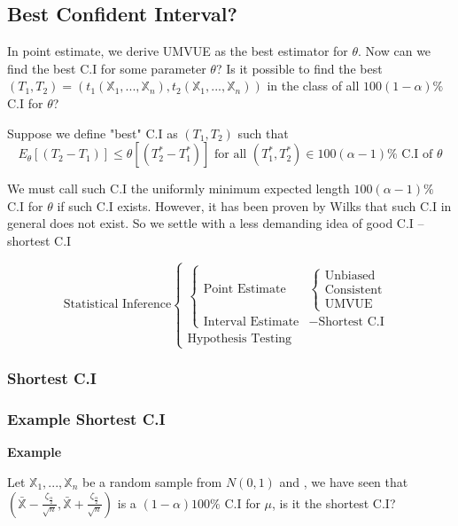 \subsection{Best Confident Interval?}

In point estimate, we derive UMVUE as the best estimator for $\theta$. Now can we find the best C.I for some parameter $\theta$? Is it possible to find the best $(T_1, T_2) = (t_1(\mathbb{X}_1, ..., \mathbb{X}_n), t_2(\mathbb{X}_1, ..., \mathbb{X}_n))$ in the class of all $100(1-\alpha)\%$ C.I for $\theta$?

Suppose we define "best" C.I as $(T_1, T_2)$ such that 
$$E_\theta[(T_2-T_1)] \leq \theta[(T_2^*-T_1^*)] \text{ for all } (T_1^*, T_2^*) \in 100(\alpha-1)\% \text{ C.I of } \theta $$

We must call such C.I the uniformly minimum expected length $100(\alpha-1)\%$ C.I for $\theta$ if such C.I exists. However, it has been proven by Wilks that such C.I in general does not exist. So we settle with a less demanding idea of good C.I -- shortest C.I

$$\text{Statistical Inference}
\begin{cases}
  \begin{cases}
    \text{Point Estimate} &
      \begin{cases}
        \text{Unbiased} \\
        \text{Consistent} \\
        \text{UMVUE}
      \end{cases} \\
    \text{Interval Estimate} & -
      \text{Shortest C.I}
  \end{cases} \\
  \text{Hypothesis Testing}
\end{cases}
$$

\subsubsection{Shortest C.I}

\subsubsection{Example Shortest C.I}

\textbf{Example}

Let $\mathbb{X}_1, ..., \mathbb{X}_n$ be a random sample from $N(0, 1)$ and , we have seen that $(\bar{\mathbb{X}}-\frac{\zeta_{\frac{\alpha}{2}}}{\sqrt{n}}, \bar{\mathbb{X}}+\frac{\zeta_{\frac{\alpha}{2}}}{\sqrt{n}})$ is a $(1-\alpha)100\%$ C.I for $\mu$, is it the shortest C.I?

